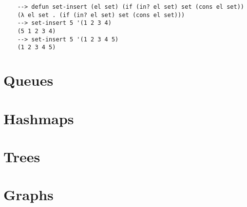 \begin{Verbatim}
    --> defun set-insert (el set) (if (in? el set) set (cons el set))
    (λ el set . (if (in? el set) set (cons el set)))
    --> set-insert 5 '(1 2 3 4)
    (5 1 2 3 4)
    --> set-insert 5 '(1 2 3 4 5)
    (1 2 3 4 5)
\end{Verbatim}



\section{Queues}

\section{Hashmaps}

\section{Trees}

\section{Graphs}
